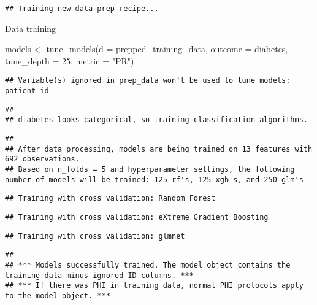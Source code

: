 \documentclass[
]{article}
\newenvironment{Shaded}{\begin{snugshade}}{\end{snugshade}}
\newcommand{\AttributeTok}[1]{\textcolor[rgb]{0.77,0.63,0.00}{#1}}
\newcommand{\DecValTok}[1]{\textcolor[rgb]{0.00,0.00,0.81}{#1}}
\newcommand{\FunctionTok}[1]{\textcolor[rgb]{0.00,0.00,0.00}{#1}}
\newcommand{\NormalTok}[1]{#1}
\newcommand{\OtherTok}[1]{\textcolor[rgb]{0.56,0.35,0.01}{#1}}
\newcommand{\StringTok}[1]{\textcolor[rgb]{0.31,0.60,0.02}{#1}}
\begin{document}
\begin{verbatim}
## Training new data prep recipe...
\end{verbatim}

Data training

\begin{Shaded}
\begin{Highlighting}[]
\NormalTok{models }\OtherTok{\textless{}{-}} \FunctionTok{tune\_models}\NormalTok{(}\AttributeTok{d =}\NormalTok{ prepped\_training\_data,}
                      \AttributeTok{outcome =}\NormalTok{ diabetes,}
                      \AttributeTok{tune\_depth =} \DecValTok{25}\NormalTok{,}
                      \AttributeTok{metric =} \StringTok{"PR"}\NormalTok{)}
\end{Highlighting}
\end{Shaded}

\begin{verbatim}
## Variable(s) ignored in prep_data won't be used to tune models: patient_id
\end{verbatim}

\begin{verbatim}
## 
## diabetes looks categorical, so training classification algorithms.
\end{verbatim}

\begin{verbatim}
## 
## After data processing, models are being trained on 13 features with 692 observations.
## Based on n_folds = 5 and hyperparameter settings, the following number of models will be trained: 125 rf's, 125 xgb's, and 250 glm's
\end{verbatim}

\begin{verbatim}
## Training with cross validation: Random Forest
\end{verbatim}

\begin{verbatim}
## Training with cross validation: eXtreme Gradient Boosting
\end{verbatim}

\begin{verbatim}
## Training with cross validation: glmnet
\end{verbatim}

\begin{verbatim}
## 
## *** Models successfully trained. The model object contains the training data minus ignored ID columns. ***
## *** If there was PHI in training data, normal PHI protocols apply to the model object. ***
\end{verbatim}
\end{document}
